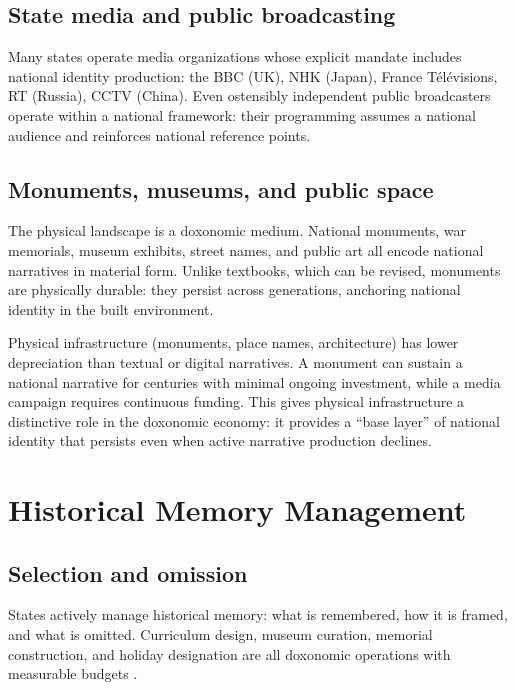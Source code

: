 \subsection{State media and public broadcasting}

Many states operate media organizations whose explicit mandate includes national identity production: the BBC (UK), NHK (Japan), France T\'{e}l\'{e}visions, RT (Russia), CCTV (China).
Even ostensibly independent public broadcasters operate within a national framework: their programming assumes a national audience and reinforces national reference points.

\subsection{Monuments, museums, and public space}

The physical landscape is a doxonomic medium.
National monuments, war memorials, museum exhibits, street names, and public art all encode national narratives in material form.
Unlike textbooks, which can be revised, monuments are physically durable: they persist across generations, anchoring national identity in the built environment.

\begin{proposition}
\label{prop:material-persistence}
Physical infrastructure (monuments, place names, architecture) has lower depreciation than textual or digital narratives.
A monument can sustain a national narrative for centuries with minimal ongoing investment, while a media campaign requires continuous funding.
This gives physical infrastructure a distinctive role in the doxonomic economy: it provides a ``base layer'' of national identity that persists even when active narrative production declines.
\end{proposition}

\section{Historical Memory Management}
\label{sec:ch27-memory}

\subsection{Selection and omission}

States actively manage historical memory: what is remembered, how it is framed, and what is omitted.
Curriculum design, museum curation, memorial construction, and holiday designation are all doxonomic operations with measurable budgets \autocite{anderson2006}.


